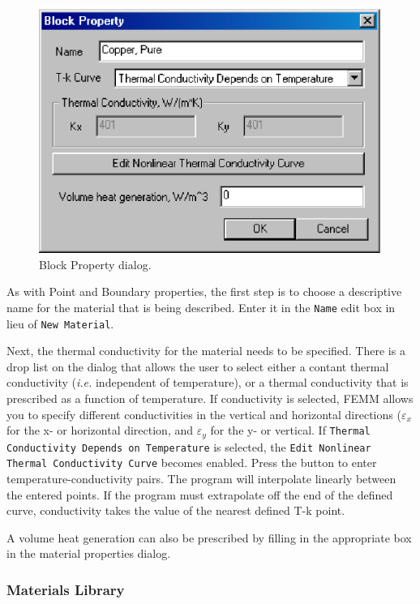\begin{figure}[htbp]
\centerline{\includegraphics{hblockprop.ps}}
\caption{Block Property dialog.}
\label{hfig10}
\end{figure}

As with Point and Boundary properties, the first step is to choose a
descriptive name for the material that is being described. Enter it in the
\texttt{Name} edit box in lieu of {\tt New Material}.

Next, the thermal conductivity for the material needs to be specified. There is a drop
list on the dialog that allows the user to select either a contant thermal conductivity
({\em i.e.} independent of temperature), or a thermal conductivity that is prescribed
as a function of temperature. If conductivity is selected, FEMM allows you
to specify different conductivities in the vertical and horizontal
directions (\textit{$\varepsilon $}$_{x}$ for the x- or horizontal direction, and \textit{$\varepsilon $}$_{y}$ for the y-
or vertical. If {\tt Thermal Conductivity Depends on Temperature} is selected, the 
{\tt Edit Nonlinear Thermal Conductivity Curve} becomes enabled.  Press the button
to enter temperature-conductivity pairs.  The program will interpolate linearly between 
the entered points.  If the program must extrapolate off the end of the defined curve,
conductivity takes the value of the nearest defined T-k point.

A volume heat generation can also be prescribed by filling in the
appropriate box in the material properties dialog.

\subsubsection{Materials Library}

